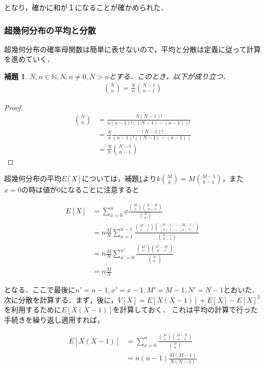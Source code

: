 \documentclass[12pt,a4j,draft]{jarticle}
\numberwithin{equation}{section}
\theoremstyle{break}
\newtheorem{lemma}{補題}[section]
\newcommand{\N}{\mathbb N}
\begin{document}
となり，確かに和が１になることが確かめられた．

\subsubsection{超幾何分布の平均と分散}

超幾何分布の確率母関数は簡単に表せないので，平均と分散は定義に従って計算を進めていく．

\begin{lemma}
    \label{lm:combination-property-1}
    $N, n \in \N, N, n \neq 0, N > n$とする．このとき，以下が成り立つ．
    \begin{align}
        \binom{N}{n} = \frac Nn \binom{N-1}{n-1}
    \end{align}
\end{lemma}

\begin{proof}
    \begin{align}
        \binom{N}{n} &= \frac{N (N-1)!}{n(n-1)! ((N-1)-(n-1))!} \\
        &= \frac Nn \frac{(N-1)!}{(n-1)!((N-1)-(n-1))} \\
        &= \frac Nn \binom{N-1}{n-1}
    \end{align}
\end{proof}

超幾何分布の平均$E[X]$については，補題\ref{lm:combination-property-1}より$k \binom{M}{k} = M \binom{M-1}{k-1}$，また $x=0$の時は値が0になることに注意すると

\begin{align}
    E[X] &= \sum_{x=0}^{n} x \frac{\binom{M}{x} \binom{N-M}{n-x}}{\binom{N}{n}} \\
    &= n \frac{M}{N} \sum_{x=1}^{n-1} \frac{\binom{M-1}{x-1} \binom{(N-1) - (M-1)}{(n-1)-(x-1)}}{\binom{N-1}{n-1}} \\
    &= n \frac MN \sum_{x'=0}^{n'} \frac{\binom{M'}{x'} \binom{N' - M'}{n'-x'}}{\binom{N'}{n'}} \\
    &= n \frac MN
\end{align}   

となる．ここで最後に$n'=n-1, x'=x-1, M'=M-1, N'=N-1$とおいた．
次に分散を計算する．まず，後に，$V[X] = E[X(X-1)] + E[X] - E[X]^2$を利用するために$E[X(X-1)]$を計算しておく．
これは平均の計算で行った手続きを繰り返し適用すれば，

\begin{align}
    E[X(X-1)] &= \sum_{x=0}^{n} \frac{\binom{M}{x} \binom{M-N}{n-x}}{\binom{N}{n}} \\
    &= n(n-1) \frac {M(M-1)}{N(N-1)}
\end{align}
\end{document}
